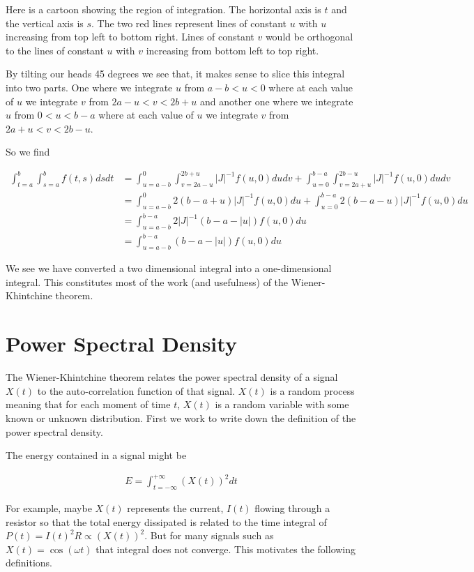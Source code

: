 \documentclass[12pt]{article}
\begin{document}
Here is a cartoon showing the region of integration. The horizontal axis is $t$ and the vertical axis is $s$. The two red lines represent lines of constant $u$ with $u$ increasing from top left to bottom right. Lines of constant $v$ would be orthogonal to the lines of constant $u$ with $v$ increasing from bottom left to top right.

By tilting our heads 45 degrees we see that, it makes sense to slice this integral into two parts. One where we integrate $u$ from $a-b<u<0$ where at each value of $u$ we integrate $v$ from $2a-u<v<2b+u$ and another one where we integrate $u$ from $0<u<b-a$ where at each value of $u$ we integrate $v$ from $2a+u<v<2b-u$.

So we find

\begin{align}
\int_{t=a}^{b} \int_{s=a}^b f(t,s) ds dt &= \int_{u=a-b}^0 \int_{v=2a-u}^{2b+u} |J|^{-1} f(u,0) du dv + \int_{u=0}^{b-a} \int_{v = 2a+u}^{2b-u} |J|^{-1} f(u,0) du dv\\
&= \int_{u=a-b}^0 2(b-a+u)|J|^{-1}f(u,0) du + \int_{u=0}^{b-a} 2(b-a-u)|J|^{-1}f(u,0) du\\
&= \int_{u=a-b}^{b-a} 2|J|^{-1} (b-a - |u|)f(u,0) du\\
& = \int_{u=a-b}^{b-a} (b-a-|u|)f(u,0) du
\end{align}

We see we have converted a two dimensional integral into a one-dimensional integral. This constitutes most of the work (and usefulness) of the Wiener-Khintchine theorem.

\section{Power Spectral Density}

The Wiener-Khintchine theorem relates the power spectral density of a signal $X(t)$ to the auto-correlation function of that signal. $X(t)$ is a random process meaning that for each moment of time $t$, $X(t)$ is a random variable with some known or unknown distribution. First we work to write down the definition of the power spectral density.

The energy contained in a signal might be

\begin{align}
E = \int_{t=-\infty}^{+\infty} (X(t))^2 dt
\end{align}

For example, maybe $X(t)$ represents the current, $I(t)$ flowing through a resistor so that the total energy dissipated is related to the time integral of $P(t) = I(t)^2 R \propto (X(t))^2$. But for many signals such as $X(t) = \cos(\omega t)$ that integral does not converge. This motivates the following definitions.
\end{document}
